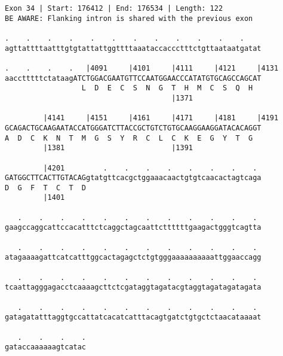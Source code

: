 \documentclass{article}
\begin{document}
\begin{Verbatim}
Exon 34 | Start: 176412 | End: 176534 | Length: 122
BE AWARE: Flanking intron is shared with the previous exon
 
.    .    .    .    .    .    .    .    .    .    .    .    
agttattttaatttgtgtattattggttttaaataccaccctttctgttaataatgatat
  
.    .    .    .   |4091     |4101     |4111     |4121     |4131
aacctttttctataagATCTGGACGAATGTTCCAATGGAACCCATATGTGCAGCCAGCAT
                  L  D  E  C  S  N  G  T  H  M  C  S  Q  H  
                                       |1371                
  
         |4141     |4151     |4161     |4171     |4181     |4191
GCAGACTGCAAGAATACCATGGGATCTTACCGCTGTCTGTGCAAGGAAGGATACACAGGT
A  D  C  K  N  T  M  G  S  Y  R  C  L  C  K  E  G  Y  T  G  
         |1381                         |1391                
  
         |4201         .    .    .    .    .    .    .    . 
GATGGCTTCACTTGTACAGgtatgttcacgctggaaacaactgtgtcaacactagtcaga
D  G  F  T  C  T  D                                         
         |1401                                              
  
   .    .    .    .    .    .    .    .    .    .    .    . 
gaagccaggcattccacatttctcaggctagcaattcttttttgaagactgggtcagtta
  
   .    .    .    .    .    .    .    .    .    .    .    . 
atagaaaagattcatcatttggcactagagctctgtgggaaaaaaaaaattggaaccagg
  
   .    .    .    .    .    .    .    .    .    .    .    . 
tcaattagggagacctcaaaagcttctcgataggtagatacgtaggtagatagatagata
  
   .    .    .    .    .    .    .    .    .    .    .    . 
gatagatatttaggtgccattatcacatcatttacagtgatctgtgctctaacataaaat
  
   .    .    .    .
gataccaaaaaagtcatac
\end{Verbatim}
\newpage
\end{document}
